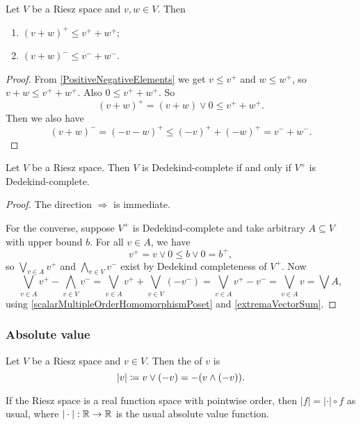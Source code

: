 \begin{proposition} \label{triangleInequalityPositiveNegativeElements}
Let $V$ be a Riesz space and $v,w\in V$. Then
\begin{enumerate}
\item $(v+w)^+ \leq v^+ + w^+$;
\item $(v+w)^- \leq v^- + w^-$.
\end{enumerate}
\end{proposition}
\begin{proof}
From \ref{PositiveNegativeElements} we get $v \leq v^+$ and $w\leq w^+$, so $v+w \leq v^+ + w^+$. Also $0 \leq v^+ + w^+$. So
\[ (v+w)^+ = (v+w)\vee 0 \leq v^+ + w^+. \]
Then we also have
\[ (v+w)^- = (-v-w)^+ \leq (-v)^+ + (-w)^+ = v^- + w^-. \]
\end{proof}

\begin{lemma} \label{DedekindCompletenessFromPositiveCone}
Let $V$ be a Riesz space. Then $V$ is Dedekind-complete \textup{if and only if} $V^+$ is Dedekind-complete.
\end{lemma}
\begin{proof}
The direction $\Rightarrow$ is immediate.

For the converse, suppose $V^+$ is Dedekind-complete and take arbitrary $A\subseteq V$ with upper bound $b$. For all $v \in A$, we have
\[ v^+ = v\vee 0 \leq b \vee 0 = b^+, \]
so $\bigvee_{v\in A}v^+$ and $\bigwedge_{v\in V}v^-$ exist by Dedekind completeness of $V^+$. Now
\[ \bigvee_{v\in A}v^+ - \bigwedge_{v\in V}v^- = \bigvee_{v\in A}v^+ + \bigvee_{v\in V}(-v^-) = \bigvee_{v\in A}v^+ - v^- = \bigvee_{v\in A}v = \bigvee A, \]
using \ref{scalarMultipleOrderHomomorphismPoset} and \ref{extremaVectorSum}.
\end{proof}

\subsubsection{Absolute value}
\begin{definition}
Let $V$ be a Riesz space and $v\in V$. Then the  of $v$ is
\[ |v| \coloneqq v\vee (-v) = -(v\wedge (-v)). \]
\end{definition}

If the Riesz space is a real function space with pointwise order, then $|f| = |\cdot|\circ f$ as usual, where $|\cdot|: \mathbb{R}\to \mathbb{R}$ is the usual absolute value function.

